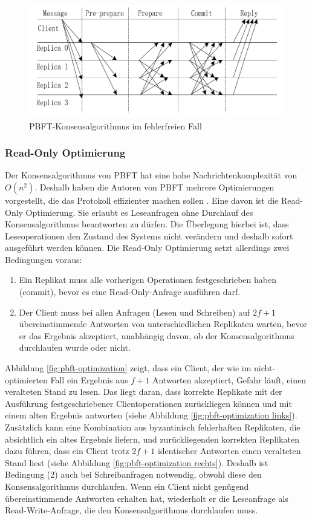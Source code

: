 \documentclass[nonacm,sigconf,natbib=false]{acmart}
\begin{document}
\begin{figure}
  \centering
  \includegraphics[width=\linewidth]{pbft-normal.png}
  \caption{PBFT-Konsensalgorithmus im fehlerfreien Fall}
  \label{fig:pbft-normal}
\end{figure}

\subsubsection{Read-Only Optimierung}

Der Konsensalgorithmus von PBFT hat eine hohe Nachrichtenkomplexität von $O(n^2)$. Deshalb haben die Autoren von PBFT mehrere Optimierungen vorgestellt, die das Protokoll effizienter machen sollen \cite{pbft-optimization}. Eine davon ist die Read-Only Optimierung. Sie erlaubt es Leseanfragen ohne Durchlauf des Konsensalgorithmus beantworten zu dürfen. Die Überlegung hierbei ist, dass Leseoperationen den Zustand des Systems nicht verändern und deshalb sofort ausgeführt werden können. Die Read-Only Optimierung setzt allerdings zwei Bedingungen voraus:
\begin{enumerate}
  \item Ein Replikat muss alle vorherigen Operationen festgeschrieben haben (commit), bevor es eine Read-Only-Anfrage ausführen darf.
  \item Der Client muss bei allen Anfragen (Lesen und Schreiben) auf $2f+1$ übereinstimmende Antworten von unterschiedlichen Replikaten warten, bevor er das Ergebnis akzeptiert, unabhängig davon, ob der Konsensalgorithmus durchlaufen wurde oder nicht. 
\end{enumerate}
Abbildung \ref{fig:pbft-optimization} zeigt, dass ein Client, der wie im nicht-optimierten Fall ein Ergebnis aus $f+1$ Antworten akzeptiert, Gefahr läuft, einen veralteten Stand zu lesen. Das liegt daran, dass korrekte Replikate mit der Ausführung festgeschriebener Clientoperationen zurückliegen können und mit einem alten Ergebnis antworten (siehe Abbildung \ref{fig:pbft-optimization links}). Zusätzlich kann eine Kombination aus byzantinisch fehlerhaften Replikaten, die absichtlich ein altes Ergebnis liefern, und zurückliegenden korrekten Replikaten dazu führen, dass ein Client trotz $2f+1$ identischer Antworten einen veralteten Stand liest (siehe Abbildung \ref{fig:pbft-optimization rechts}). Deshalb ist Bedingung (2) auch bei Schreibanfragen notwendig, obwohl diese den Konsensalgorithmus durchlaufen. Wenn ein Client nicht genügend übereinstimmende Antworten erhalten hat, wiederholt er die Leseanfrage als Read-Write-Anfrage, die den Konsensalgorithmus durchlaufen muss.
\end{document}
